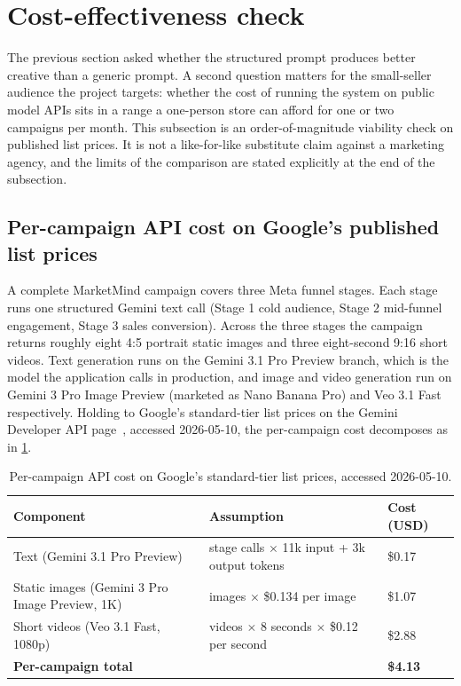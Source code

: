 \documentclass[12pt,a4paper]{report}
\begin{document}
\section{Cost-effectiveness check}
\label{sec:cost}

The previous section asked whether the structured prompt produces better creative than a generic prompt. A second question matters for the small-seller audience the project targets: whether the cost of running the system on public model APIs sits in a range a one-person store can afford for one or two campaigns per month. This subsection is an order-of-magnitude viability check on published list prices. It is not a like-for-like substitute claim against a marketing agency, and the limits of the comparison are stated explicitly at the end of the subsection.

\subsection*{Per-campaign API cost on Google's published list prices}

A complete MarketMind campaign covers three Meta funnel stages. Each stage runs one structured Gemini text call (Stage 1 cold audience, Stage 2 mid-funnel engagement, Stage 3 sales conversion). Across the three stages the campaign returns roughly eight 4:5 portrait static images and three eight-second 9:16 short videos. Text generation runs on the Gemini 3.1 Pro Preview branch, which is the model the application calls in production, and image and video generation run on Gemini 3 Pro Image Preview (marketed as Nano Banana Pro) and Veo 3.1 Fast respectively. Holding to Google's standard-tier list prices on the Gemini Developer API page~\cite{googlepricing2026}, accessed 2026-05-10, the per-campaign cost decomposes as in \cref{tab:apicost}.

\begin{table}[ht!]
  \centering
  \caption{Per-campaign API cost on Google's standard-tier list prices, accessed 2026-05-10.}
  \label{tab:apicost}
  \small
  \begin{tabular}{@{}>{\raggedright\arraybackslash}p{2.3in}>{\raggedright\arraybackslash}p{2.6in}>{\raggedleft\arraybackslash}p{0.7in}@{}}
    \toprule
    Component & Assumption & Cost (USD) \\
    \midrule
    Text (Gemini 3.1 Pro Preview) & 3 stage calls $\times$ 11k input + 3k output tokens & \$0.17 \\
    \addlinespace
    Static images (Gemini 3 Pro Image Preview, 1K) & 8 images $\times$ \$0.134 per image & \$1.07 \\
    \addlinespace
    Short videos (Veo 3.1 Fast, 1080p) & 3 videos $\times$ 8 seconds $\times$ \$0.12 per second & \$2.88 \\
    \midrule
    \textbf{Per-campaign total} & & \textbf{\$4.13} \\
    \bottomrule
  \end{tabular}
\end{table}
\end{document}
